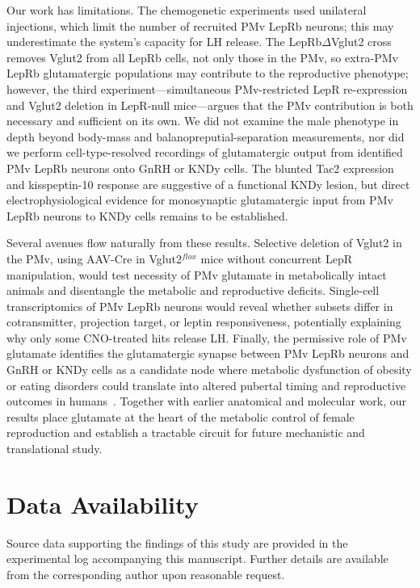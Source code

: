 \documentclass[11pt]{article}
\begin{document}
Our work has limitations. The chemogenetic experiments used unilateral injections, which limit the number of recruited PMv LepRb neurons; this may underestimate the system's capacity for LH release. The LepRb$\Delta$Vglut2 cross removes Vglut2 from all LepRb cells, not only those in the PMv, so extra-PMv LepRb glutamatergic populations may contribute to the reproductive phenotype; however, the third experiment---simultaneous PMv-restricted LepR re-expression and Vglut2 deletion in LepR-null mice---argues that the PMv contribution is both necessary and sufficient on its own. We did not examine the male phenotype in depth beyond body-mass and balanopreputial-separation measurements, nor did we perform cell-type-resolved recordings of glutamatergic output from identified PMv LepRb neurons onto GnRH or KNDy cells. The blunted Tac2 expression and kisspeptin-10 response are suggestive of a functional KNDy lesion, but direct electrophysiological evidence for monosynaptic glutamatergic input from PMv LepRb neurons to KNDy cells remains to be established.

Several avenues flow naturally from these results. Selective deletion of Vglut2 in the PMv, using AAV-Cre in Vglut2$^{flox}$ mice without concurrent LepR manipulation, would test necessity of PMv glutamate in metabolically intact animals and disentangle the metabolic and reproductive deficits. Single-cell transcriptomics of PMv LepRb neurons would reveal whether subsets differ in cotransmitter, projection target, or leptin responsiveness, potentially explaining why only some CNO-treated hits release LH. Finally, the permissive role of PMv glutamate identifies the glutamatergic synapse between PMv LepRb neurons and GnRH or KNDy cells as a candidate node where metabolic dysfunction of obesity or eating disorders could translate into altered pubertal timing and reproductive outcomes in humans~\citep{farooqi2014twenty,ahima1997leptin,amstalden2011neuroendocrine}. Together with earlier anatomical and molecular work, our results place glutamate at the heart of the metabolic control of female reproduction and establish a tractable circuit for future mechanistic and translational study.

\section*{Data Availability}
Source data supporting the findings of this study are provided in the experimental log accompanying this manuscript. Further details are available from the corresponding author upon reasonable request.
\end{document}
